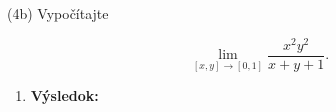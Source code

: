 \pr (4b)
Vypočítajte

$$
\lim\limits_{
[x,y]\rightarrow [0,1]}
\frac{x^2y^2}{x+y+1}.
$$

\begin{enumerate}
\item[]\textbf{Výsledok:}\gr
\end{enumerate}
